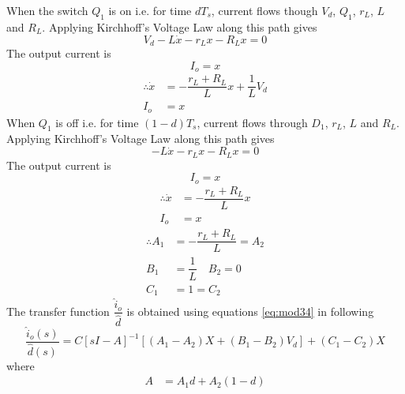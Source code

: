 	When the switch $Q_1$ is on i.e. for time $dT_s$, current flows though $V_d$, $Q_1$, $r_{L}$, $L$ and $R_L$. Applying Kirchhoff's Voltage Law along this path gives
	\begin{equation}
		V_d - L \dot{x} - r_{L}x - R_Lx = 0
		\label{eq:mod28}
	\end{equation}
		The output current is
	\begin{equation}
		I_o = x
		\label{eq:mod29}
	\end{equation}
	\begin{equation}
		\begin{split}
			\therefore \dot{x} &= -\dfrac{r_{L}+R_L}{L}x +\dfrac{1}{L}V_d\\
			I_o &= x	
		\end{split}
		\label{eq:mod30}
	\end{equation}
	When $Q_1$ is off i.e. for time $(1-d)T_s$, current flows through  $D_1$, $r_{L}$, $L$ and $R_L$. Applying Kirchhoff's Voltage Law along this path gives
	\begin{equation}
		- L \dot{x} - r_{L}x - R_Lx = 0
		\label{eq:mod31}
	\end{equation}
	The output current is
	\begin{equation}
		I_o = x
		\label{eq:mod32}
	\end{equation}
	\begin{equation}
		\begin{split}
			\therefore \dot{x} &= -\dfrac{r_{L}+R_L}{L}x\\
			I_o &= x
		\end{split}
		\label{eq:mod33}
	\end{equation}
	\begin{equation}
		\begin{split}
			\therefore A_1 &= -\dfrac{r_{L}+R_L}{L} = A_2\\
			B_1 &= \dfrac{1}{L} \quad B_2 = 0\\
			C_1 &= 1 = C_2
		\end{split}
		\label{eq:mod34}
	\end{equation}
	The transfer function $\dfrac{\hat{i}_o}{\hat{d}}$ is obtained using equations \eqref{eq:mod34} in following \cite{book:768263} 
	\begin{equation}
		\dfrac{\hat{i}_o(s)}{\hat{d}(s)} = C[sI-A]^{-1}[(A_1-A_2)X+(B_1-B_2)V_d]+(C_1-C_2)X
		\label{eq:mod35}
	\end{equation}
	where
	\begin{align}
		A &= A_1d+A_2(1-d)
		\label{eq:mod36}
	\end{align}
